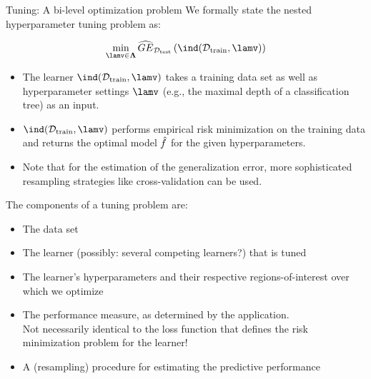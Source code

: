 \begin{vbframe}{Tuning: A bi-level optimization problem} 
We formally state the nested hyperparameter tuning problem as: 

$$
\min_{\lamv \in \bm{\Lambda}} \GEh{\Dtest}\left(\ind(\Dtrain, \lamv)\right) 
$$

\begin{itemize}
\item The learner $\ind(\Dtrain, \lamv)$ takes a training data set as well as hyperparameter settings $\lamv$ (e.g., the maximal depth of a classification tree) as an input. 
\item $\ind(\Dtrain, \lamv)$ performs empirical risk minimization on the training data and returns the optimal model $\hat{f}$ for the given hyperparameters. 
\item Note that for the estimation of the generalization error, more sophisticated resampling strategies like cross-validation can be used.
\end{itemize}

\framebreak

The components of a tuning problem are: 

\begin{itemize}
\item The data set
\item The learner (possibly: several competing learners?) that is tuned %
\item The learner's hyperparameters and their respective regions-of-interest over which we optimize %
\item The performance measure, as determined by the application.\\ Not necessarily identical to the loss function that defines the risk minimization problem for the learner!\\ 
\item A (resampling) procedure for estimating the predictive performance
\end{itemize}



\end{vbframe}





